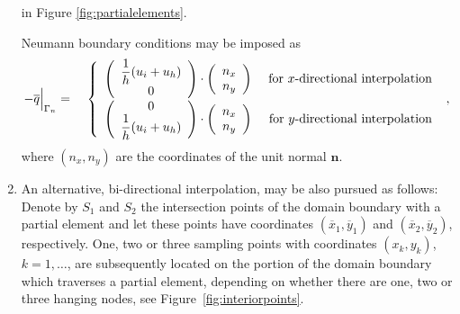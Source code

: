 \documentclass[12pt,twoside]{article}
\newcommand{\bn}{\mathbf{n}}
\begin{document}
\begin{enumerate}
in Figure \ref{fig:partialelements}. 
\par
Neumann boundary conditions may be imposed as 
\begin{eqnarray}
-\overline{q}\Bigl|_{\Gamma_n} &=& \ \left\{ 
\begin{array}{lr} 
\left( \begin{array}{c} \dfrac{1}{h} (u_i + u_h) \\ 0 \end{array} \right) \cdot \left(\begin{array}{c} n_x\\ n_y \end{array}\right)&
\text{ for } x\text{-directional interpolation} \\
\left( \begin{array}{c} 0 \\ \dfrac{1}{h} (u_i +  u_h) \end{array} \right) \cdot\left(\begin{array}{c} n_x\\ n_y \end{array}\right)&
\text{ for } y\text{-directional interpolation}
\end{array}
\right.\ ,
\end{eqnarray}
where $(n_x,n_y)$ are the coordinates of the unit normal $\bn$. 
%
\item An alternative, bi-directional interpolation, may be also
pursued as follows: Denote by $S_1$ and $S_2$ the intersection points
of the domain boundary with a partial element and let these points
have coordinates $(\overline{x}_1,\overline{y}_1)$ and 
$(\overline{x}_2,\overline{y}_2)$, respectively. One, two
or three sampling points with coordinates 
$(x_k,y_k)$, $k=1,\ldots$, are subsequently located on the
portion of the domain boundary which traverses a partial element,
depending on whether there are one, two or three hanging nodes, see
Figure~\ref{fig:interiorpoints}. 


\end{enumerate}
\end{document}
